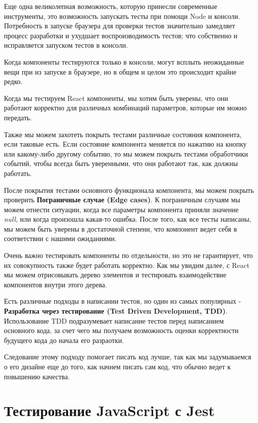Еще одна великолепная возможность, которую принесли современные инструменты, это возможность запускать тесты при помощи Node и консоли. Потребность в запуске браузера для проверки тестов значительно замедляет процесс разработки и ухудшает воспроизводимость тестов; что собственно и исправляется запуском тестов в консоли.

Когда компоненты тестируются только в консоли, могут всплыть неожиданные вещи при из запуске в браузере, но в общем и целом это происходит крайне редко.

Когда мы тестируем React компоненты, мы хотим быть уверены, что они работают корректно для различных комбинаций параметров, которые им можно передать. 

Также мы можем захотеть покрыть тестами различные состояния компонента, если таковые есть. Если состояние компонента меняется по нажатию на кнопку или какому-либо другому событию, то мы можем покрыть тестами обработчики событий, чтобы всегда быть уверенными, что они работают так, как должны работать.

После покрытия тестами основного функционала компонента, мы можем покрыть проверить \textbf{Пограничные случае (Edge cases)}. К пограничным случаям мы можем отнести ситуации, когда все параметры компонента приняли значение \textit{null}, или когда произошла какая-то ошибка. После того, как все тесты написаны, мы можем быть уверены в достаточной степени, что компонент ведет себя в соответствии с нашими ожиданиями.

Очень важно тестировать компоненты по отдельности, но это не гарантирует, что их совокупность также будет работать корректно. Как мы увидим далее, с React мы можем отрисовывать дерево элементов и тестировать взаимодействие компонентов внутри этого дерева. 

Есть различные подходы в написании тестов, но один из самых популярных - \textbf{Разработка через тестирование (Test Driven Development, TDD)}. Использование TDD подразумевает написание тестов перед написанием основного кода, за счет чего мы получаем возможность оценки корректности будущего кода до начала его разраотки. 

Следование этому подходу помогает писать код лучше, так как мы задумываемся о его дизайне еще до того, как начнем писать сам код, что обычно ведет к повышению качества.

\section{Тестирование JavaScript с Jest}

